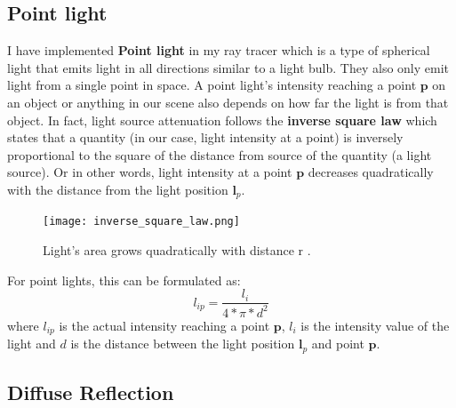 \documentclass[11pt,a4paper]{article}
\begin{document}
	\subsection{Point light}
	I have implemented \textbf{Point light} in my ray tracer which is a type of spherical light that emits light in all directions similar to a light bulb. They also only emit light from a single point in space. A point light's intensity reaching a point $\boldsymbol{p}$ on an object or anything in our scene also depends on how far the light is from that object. In fact, light source attenuation follows the \textbf{inverse square law} \cite{inversesquarelaw2} which states that a quantity (in our case, light intensity at a point) is inversely proportional to the square of the distance from source of the quantity (a light source). Or in other words, light intensity at a point $\boldsymbol{p}$ decreases quadratically with the distance from the light position $\boldsymbol{l}_{p}$. 
	\begin{figure}[H]
		\centering
		\texttt{[image: inverse\_square\_law.png]}\quad
		\caption{Light's area grows quadratically with distance r \protect\cite{inversesquarelaw}.}
	\end{figure}
	\noindent For point lights, this can be formulated as:
	\begin{equation}
		l_{ip} = \frac{l_{i}}{4 * \pi * d^2}
	\end{equation}
	where $l_{ip}$ is the actual intensity reaching a point $\boldsymbol{p}$, $l_{i}$ is the intensity value of the light and $d$ is the distance between the light position $\boldsymbol{l}_{p}$ and point $\boldsymbol{p}$.
	\subsection{Diffuse Reflection} 
	
\end{document}
